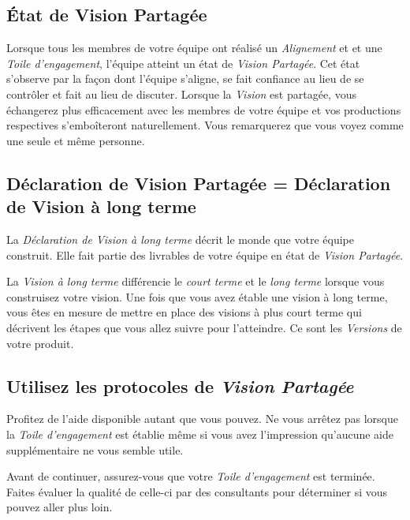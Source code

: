 \documentclass[11pt]{book}
\begin{document}
\subsection{État de Vision Partagée}

Lorsque tous les membres de votre équipe ont réalisé un \emph{Alignement} et et une \emph{Toile d'engagement}, l'équipe atteint un état
de \emph{Vision Partagée}. Cet état s'observe par la façon dont l'équipe s'aligne, se fait confiance au lieu de se contrôler et fait au 
lieu de discuter. Lorsque la \emph{Vision} est partagée, vous échangerez plus efficacement avec les membres de votre équipe et vos 
productions respectives s'emboîteront naturellement. Vous remarquerez que vous \og{}voyez comme une seule et même personne\fg{}.

\subsection{Déclaration de Vision Partagée = Déclaration de Vision à long terme}

La \emph{Déclaration de Vision à long terme} décrit le monde que votre équipe construit. Elle fait partie des livrables de votre équipe
en état de \emph{Vision Partagée}.

La \emph{Vision à long terme} différencie le \emph{court terme} et le \emph{long terme} lorsque vous construisez votre vision. Une fois
que vous avez étable une vision à long terme, vous êtes en mesure de mettre en place des visions à plus court terme qui décrivent les
étapes que vous allez suivre pour l'atteindre. Ce sont les \emph{Versions} de votre produit.

\subsection{Utilisez les protocoles de \emph{Vision Partagée}}

Profitez de l'aide disponible autant que vous pouvez. Ne vous arrêtez pas lorsque la \emph{Toile d'engagement} est
établie même si vous avez l'impression qu'aucune aide supplémentaire ne vous semble utile.

Avant de continuer, assurez-vous que votre \emph{Toile d'engagement} est terminée. Faites évaluer la qualité de celle-ci par des 
consultants pour déterminer si vous pouvez aller plus loin.
\end{document}
